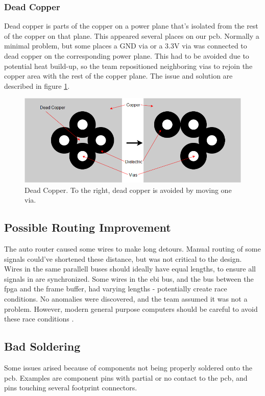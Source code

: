 \subsubsection{Dead Copper}
Dead copper is parts of the copper on a power plane that's isolated from the rest of the copper on that plane.
This appeared several places on our \gls{pcb}. Normally a minimal problem, but some places a GND via or a 3.3V via was connected to dead copper on the corresponding power plane.
This had to be avoided due to potential heat build-up, so the team repositioned neighboring vias to rejoin the copper area with the rest of the copper plane. The issue and solution are described in figure \ref{fig:Dead copper}.

\begin{figure}[h!]
\centering
\includegraphics[scale = 0.4]{images/Dead_Copper.png}
\caption{Dead Copper. To the right, dead copper is avoided by moving one via.}
\label{fig:Dead copper}
\end{figure}

\subsection{Possible Routing Improvement}
The auto router caused some wires to make long detours.
Manual routing of some signals could've shortened these distance, but was not critical to the design.
Wires in the same parallell buses should ideally have equal lengths, to ensure all signals in are synchronized.
Some wires in the \gls{ebi} bus, and the bus between the \gls{fpga} and the frame buffer, had varying lengths - potentially create race conditions.
No anomalies were discovered, and the team assumed it was not a problem.
However, modern general purpose computers should be careful to avoid these race conditions \cite{race-conditions}.

\subsection{Bad Soldering}
Some issues arised because of components not being properly soldered onto the \gls{pcb}. Examples are component pins with partial or no contact to the \gls{pcb}, and pins touching several footprint connectors.

